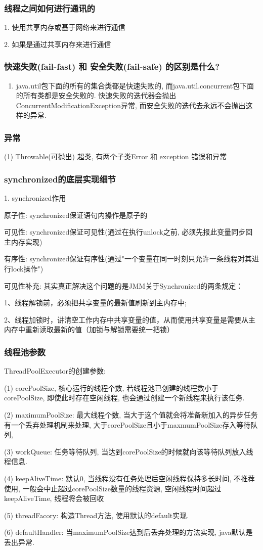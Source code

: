 \documentclass[UTF8]{ctexart}
\begin{document}
\subsubsection{线程之间如何进行通讯的}
1. 使用共享内存或基于网络来进行通信 \par
2. 如果是通过共享内存来进行通信
\subsubsection{快速失败(fail-fast) 和 安全失败(fail-safe) 的区别是什么?}
\begin{enumerate}
	\item java.util包下面的所有的集合类都是快速失败的, 而java.util.concurrent包下面的所有类都是安全失败的. 快速失败的迭代器会抛出ConcurrentModificationException异常, 而安全失败的迭代去永远不会抛出这样的异常.

\end{enumerate}
\subsubsection{异常}
(1) Throwable(可抛出) 超类, 有两个子类Error 和 exception 错误和异常
\subsubsection{synchronized的底层实现细节}
1. synchronized作用 \par
原子性: synchronized保证语句内操作是原子的 \par
可见性: synchronized保证可见性(通过在执行unlock之前, 必须先报此变量同步回主内存实现) \par
有序性: synchronized保证有序性(通过"一个变量在同一时刻只允许一条线程对其进行lock操作") \par
可见性补充: 	其实真正解决这个问题的是JMM关于Synchronized的两条规定： 
\par
1、线程解锁前，必须把共享变量的最新值刷新到主内存中; \par
2、线程加锁时，讲清空工作内存中共享变量的值，从而使用共享变量是需要从主内存中重新读取最新的值（加锁与解锁需要统一把锁） \par
\subsubsection{线程池参数}
ThreadPoolExecutor的创建参数: \par
(1) corePoolSize, 核心运行的线程个数, 若线程池已创建的线程数小于corePoolSize, 即使此时存在空闲线程, 也会通过创建一个新线程来执行该任务. \par
(2) maximumPoolSize: 最大线程个数, 当大于这个值就会将准备新加入的异步任务有一个丢弃处理机制来处理, 大于corePoolSize且小于maxmumPoolSize存入等待队列,\par
(3) workQueue: 任务等待队列, 当达到corePoolSize的时候就向该等待队列放入线程信息.\par
(4) keepAliveTime: 默认0, 当线程没有任务处理后空闲线程保持多长时间, 不推荐使用, 一般会中止超过corePoolSize数量的线程资源, 空闲线程时间超过keepAliveTime, 线程将会被回收 \par
(5) threadFacory: 构造Thread方法, 使用默认的default实现. \par
(6) defaultHandler: 当maximumPoolSize达到后丢弃处理的方法实现, java默认是丢出异常. \par
\end{document}
